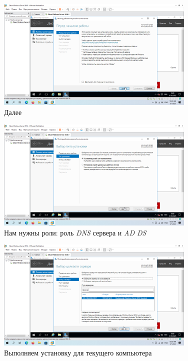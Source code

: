 \documentclass[a4paper]{article}
\begin{document}
  \begin{figure}[H]
    \centering
    \includegraphics[width=0.85\textwidth]{9_0033}
    \caption{Далее}
    \label{img:0033}
  \end{figure}

  \begin{figure}[H]
    \centering
    \includegraphics[width=0.85\textwidth]{9_0034}
    \caption{Нам нужны роли: роль \textit{DNS} сервера и \textit{AD DS}}
    \label{img:0034}
  \end{figure}

  \begin{figure}[H]
    \centering
    \includegraphics[width=0.85\textwidth]{9_0035}
    \caption{Выполняем установку для текущего компьютера}
    \label{img:0035}
  \end{figure}
\end{document}
